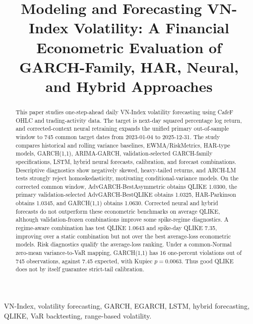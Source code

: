 \documentclass[conference]{IEEEtran}
\begin{document}
\title{Modeling and Forecasting VN-Index Volatility: A Financial Econometric Evaluation of GARCH-Family, HAR, Neural, and Hybrid Approaches}

\author{
}

\maketitle

\begin{abstract}
This paper studies one-step-ahead daily VN-Index volatility forecasting using CafeF OHLC and trading-activity data. The target is next-day squared percentage log return, and corrected-context neural retraining expands the unified primary out-of-sample window to 745 common target dates from 2023-01-04 to 2025-12-31. The study compares historical and rolling variance baselines, EWMA/RiskMetrics, HAR-type models, GARCH(1,1), ARIMA-GARCH, validation-selected GARCH-family specifications, LSTM, hybrid neural forecasts, calibration, and forecast combinations. Descriptive diagnostics show negatively skewed, heavy-tailed returns, and ARCH-LM tests strongly reject homoskedasticity, motivating conditional-variance models. On the corrected common window, AdvGARCH-BestAsymmetric obtains QLIKE 1.0300, the primary validation-selected AdvGARCH-BestQLIKE obtains 1.0325, HAR-Parkinson obtains 1.0345, and GARCH(1,1) obtains 1.0630. Corrected neural and hybrid forecasts do not outperform these econometric benchmarks on average QLIKE, although validation-frozen combinations improve some spike-regime diagnostics. A regime-aware combination has test QLIKE 1.0643 and spike-day QLIKE 7.35, improving over a static combination but not over the best average-loss econometric models. Risk diagnostics qualify the average-loss ranking. Under a common-Normal zero-mean variance-to-VaR mapping, GARCH(1,1) has 16 one-percent violations out of 745 observations, against 7.45 expected, with Kupiec \(p=0.0063\). Thus good QLIKE does not by itself guarantee strict-tail calibration.
\end{abstract}

\begin{IEEEkeywords}
VN-Index, volatility forecasting, GARCH, EGARCH, LSTM, hybrid forecasting, QLIKE, VaR backtesting, range-based volatility.
\end{IEEEkeywords}










\end{document}
